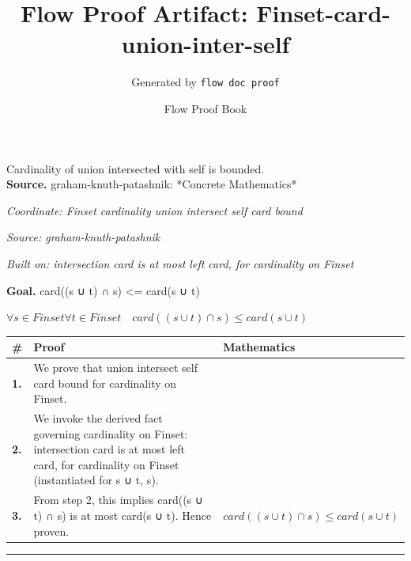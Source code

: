 \documentclass[11pt]{article}
\title{Flow Proof Artifact: Finset-card-union-inter-self}
\author{Generated by \texttt{flow doc proof}}
\date{Flow Proof Book}
\theoremstyle{definition}
\begin{document}
\maketitle
Cardinality of union intersected with self is bounded.\\[0.5em]
\textbf{Source.} graham-knuth-patashnik: *Concrete Mathematics*\\[0.5em]
\bigskip
{}\par
\smallskip\noindent\textit{Coordinate: Finset \cdot cardinality \cdot union intersect self card bound}\par
\smallskip\noindent\textit{Source: graham-knuth-patashnik}\par
\smallskip\noindent\textit{Built on: intersection card is at most left card, for cardinality on Finset}\par
\medskip
\noindent\textbf{Goal.} card((s ∪ t) ∩ s) <= card(s ∪ t)\par
\noindent$\displaystyle \forall s \in Finset \forall t \in Finset\quad card((s ∪ t) ∩ s) \le card(s ∪ t)$\par
\medskip
\noindent
\begin{tabular}{@{} >{\raggedright\arraybackslash}p{} >{\raggedright\arraybackslash}p{} >{\raggedleft\arraybackslash}p{} @{}}
\textbf{\#} & \textbf{Proof} & \textbf{Mathematics} \\
\midrule
\textbf{1.} & We prove that union intersect self card bound for cardinality on Finset. & \\[0.45em]
\textbf{2.} & We invoke the derived fact governing cardinality on Finset: intersection card is at most left card, for cardinality on Finset (instantiated for s ∪ t, s). & \\[0.45em]
\textbf{3.} & From step 2, this implies card((s ∪ t) ∩ s) is at most card(s ∪ t). Hence proven. & $\displaystyle card((s ∪ t) ∩ s) \le card(s ∪ t)$ \\[0.45em]
\bottomrule
\end{tabular}
\label{thm:Finset-cardinality-union_intersect_self_card_bound}
\par\medskip\hrule
\end{document}
